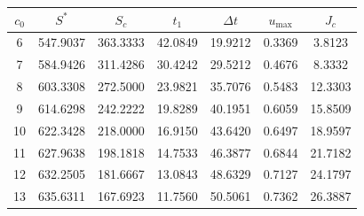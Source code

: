 \begin{tabular}{ccccccc}
\toprule
$c_0$ & $S^*$ & $S_c$ & $t_1$ & $\Delta t$ & $u_{\max}$ & $J_c$ \\
\midrule
6 & 547.9037 & 363.3333 & 42.0849 & 19.9212 & 0.3369 & 3.8123 \\
7 & 584.9426 & 311.4286 & 30.4242 & 29.5212 & 0.4676 & 8.3332 \\
8 & 603.3308 & 272.5000 & 23.9821 & 35.7076 & 0.5483 & 12.3303 \\
9 & 614.6298 & 242.2222 & 19.8289 & 40.1951 & 0.6059 & 15.8509 \\
10 & 622.3428 & 218.0000 & 16.9150 & 43.6420 & 0.6497 & 18.9597 \\
11 & 627.9638 & 198.1818 & 14.7533 & 46.3877 & 0.6844 & 21.7182 \\
12 & 632.2505 & 181.6667 & 13.0843 & 48.6329 & 0.7127 & 24.1797 \\
13 & 635.6311 & 167.6923 & 11.7560 & 50.5061 & 0.7362 & 26.3887 \\
\bottomrule
\end{tabular}
